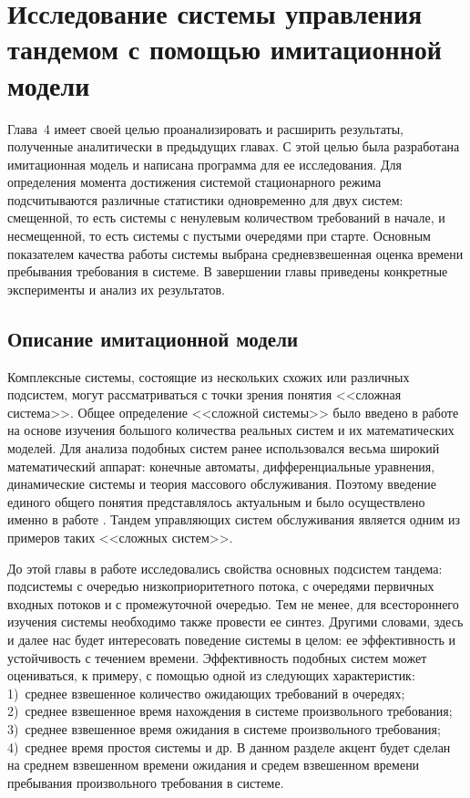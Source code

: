 \chapter{Исследование системы управления тандемом с помощью имитационной модели}						%

Глава~4 имеет своей целью проанализировать и расширить результаты, полученные аналитически в предыдущих главах. С этой целью была разработана имитационная модель и написана программа для ее исследования. Для определения момента достижения системой стационарного режима подсчитываются различные статистики одновременно для двух систем: смещенной, то есть системы с ненулевым количеством требований в начале, и несмещенной, то есть системы с пустыми очередями при старте. Основным показателем качества работы системы выбрана средневзвешенная оценка времени пребывания требования в системе. В завершении главы приведены конкретные эксперименты и анализ их результатов.

\section{Описание имитационной модели}
Комплексные системы, состоящие из нескольких схожих или различных подсистем, могут рассматриваться с точки зрения понятия <<сложная система>>. Общее определение <<сложной системы>> было введено в работе \cite{Buslenko:1978} на основе изучения большого количества реальных  систем и их математических моделей. Для анализа подобных систем ранее использовался весьма широкий математический аппарат: конечные автоматы, дифференциальные уравнения, динамические системы и теория массового обслуживания. Поэтому введение единого общего понятия представлялось актуальным и было осуществлено именно в работе \cite{Buslenko:1978}. Тандем управляющих систем обслуживания является одним из примеров таких <<сложных систем>>. 

До этой главы в работе исследовались свойства основных подсистем тандема: подсистемы с очередью низкоприоритетного потока, с очередями первичных входных потоков и с промежуточной очередью. Тем не менее, для всестороннего изучения системы необходимо также провести ее синтез. Другими словами, здесь и далее нас будет интересовать поведение системы в целом: ее эффективность и устойчивость с течением времени. Эффективность подобных систем может оцениваться, к примеру, с помощью одной из следующих характеристик: 1)~среднее взвешенное количество ожидающих требований в очередях; 2)~среднее взвешенное время нахождения в системе произвольного требования; 3)~среднее взвешенное время ожидания в системе произвольного требования; 4)~среднее время простоя системы и др. В данном разделе акцент будет сделан на среднем взвешенном времени ожидания и средем взвешенном времени пребывания произвольного требования в системе.

